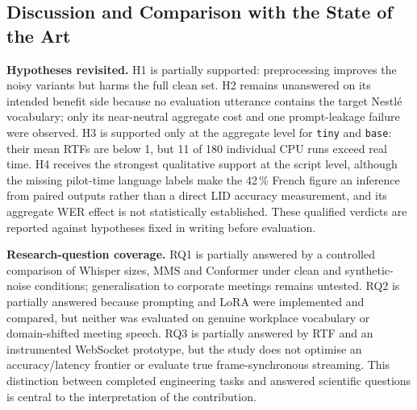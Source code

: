 \documentclass[12pt]{report}
\begin{document}
\subsection{Discussion and Comparison with the State of the Art}
\textbf{Hypotheses revisited.} H1 is partially supported: preprocessing improves the noisy variants but harms the full clean set. H2 remains unanswered on its intended benefit side because no evaluation utterance contains the target Nestl\'e vocabulary; only its near-neutral aggregate cost and one prompt-leakage failure were observed. H3 is supported only at the aggregate level for \texttt{tiny} and \texttt{base}: their mean RTFs are below 1, but 11 of 180 individual CPU runs exceed real time. H4 receives the strongest qualitative support at the script level, although the missing pilot-time language labels make the 42\,\% French figure an inference from paired outputs rather than a direct LID accuracy measurement, and its aggregate WER effect is not statistically established. These qualified verdicts are reported against hypotheses fixed in writing before evaluation.

\textbf{Research-question coverage.} RQ1 is partially answered by a controlled comparison of Whisper sizes, MMS and Conformer under clean and synthetic-noise conditions; generalisation to corporate meetings remains untested. RQ2 is partially answered because prompting and LoRA were implemented and compared, but neither was evaluated on genuine workplace vocabulary or domain-shifted meeting speech. RQ3 is partially answered by RTF and an instrumented WebSocket prototype, but the study does not optimise an accuracy/latency frontier or evaluate true frame-synchronous streaming. This distinction between completed engineering tasks and answered scientific questions is central to the interpretation of the contribution.
\end{document}
